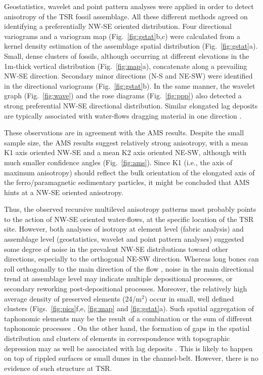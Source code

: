 \documentclass[5p,times,authoryear]{elsarticle}
\begin{document}
Geostatistics, wavelet and point pattern analyses were applied in order to detect anisotropy of the TSR fossil assemblage. All these different methods agreed on identifying a preferentially NW-SE oriented distribution. Four directional variograms and a variogram map (Fig.~\ref{fig:gstat}b,c) were calculated from a kernel density estimation of the assemblage spatial distribution (Fig.~\ref{fig:gstat}a). Small, dense clusters of fossils, although occurring at different elevations in the 1m-thick vertical distribution (Fig.~\ref{fig:map}a), concatenate along a prevailing NW-SE direction. Secondary minor directions (N-S and NE-SW) were identified in the directional variograms (Fig.~\ref{fig:gstat}b). In the same manner, the wavelet graph (Fig.~\ref{fig:wave}) and the rose diagrams (Fig.~\ref{fig:ppp}) also detected a strong preferential NW-SE directional distribution. Similar elongated lag deposits are typically associated with water-flows dragging material in one direction \citep{Dominguez-Rodrigo2012}.

These observations are in agreement with the AMS results. Despite the small sample size, the AMS results suggest relatively strong anisotropy, with a mean K1 axis oriented NW-SE and a mean K2 axis oriented NE-SW, although with much smaller confidence angles (Fig.~\ref{fig:ams}). Since K1 (i.e., the axis of maximum anisotropy) should reflect the bulk orientation of the elongated axis of the ferro/paramagnetic sedimentary particles, it might be concluded that AMS hints at a NW-SE oriented anisotropy.

Thus, the observed recursive multilevel anisotropy patterns most probably points to the action of NW-SE oriented water-flows, at the specific location of the TSR site. However, both analyses of isotropy at element level (fabric analysis) and assemblage level (geostatistics, wavelet and point pattern analyses) suggested some degree of noise in the prevalent NW-SE distributions toward other directions, especially to the orthogonal NE-SW direction. Whereas long bones can roll orthogonally to the main direction of the flow \citep{Voorhies1969}, noise in the main directional trend at assemblage level may indicate multiple depositional processes, or secondary reworking post-depositional processes. Moreover, the relatively high average density of preserved elements (24/m$^2$) occur in small, well defined clusters (Figs.~\ref{fig:pics}f,e, \ref{fig:map} and \ref{fig:gstat}a). Such spatial aggregation of taphonomic elements may be the result of a combination or the sum of different taphonomic processes \citep{Fernandez-Lopez2002}. On the other hand, the formation of gaps in the spatial distribution and clusters of elements in correspondence with topographic depression may as well be associated with lag deposits \citep{Petraglia1994}. This is likely to happen on top of rippled surfaces or small dunes in the channel-belt. However, there is no evidence of such structure at TSR.
\end{document}
